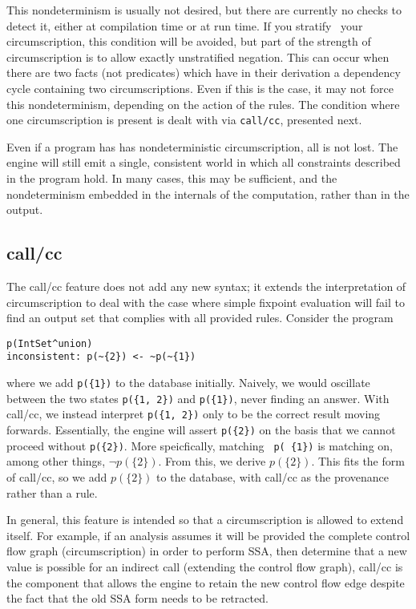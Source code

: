This nondeterminism is usually not desired, but there are currently no checks to detect it, either at compilation time or at run time.
If you stratify~\cite{prologbook} your circumscription, this condition will be avoided, but part of the strength of circumscription is to allow exactly unstratified negation.
This can occur when there are two facts (not predicates) which have in their derivation a dependency cycle containing two circumscriptions.
Even if this is the case, it may not force this nondeterminism, depending on the action of the rules.
The condition where one circumscription is present is dealt with via \texttt{call/cc}, presented next.

Even if a program has has nondeterministic circumscription, all is not lost.
The engine will still emit a single, consistent world in which all constraints described in the program hold.
In many cases, this may be sufficient, and the nondeterminism embedded in the internals of the computation, rather than in the output.

\subsection{call/cc}
\label{holmes:sec:callcc}
The call/cc feature does not add any new syntax; it extends the interpretation of circumscription to deal with the case where simple fixpoint evaluation will fail to find an output set that complies with all provided rules.
Consider the program
\begin{verbatim}
p(IntSet^union)
inconsistent: p(~{2}) <- ~p(~{1})
\end{verbatim}
where we add \texttt{p(\{1\})} to the database initially.
Naively, we would oscillate between the two states \texttt{p(\{1, 2\})} and \texttt{p(\{1\})}, never finding an answer.
With call/cc, we instead interpret \texttt{p(\{1, 2\})} only to be the correct result moving forwards.
Essentially, the engine will assert \texttt{p(\{2\})} on the basis that we cannot proceed without \texttt{p(\{2\})}.
More speicfically, matching \texttt{~p(~\{1\})} is matching on, among other things, $\neg p(\{2\})$.
From this, we derive $p(\{2\})$.
This fits the form of call/cc, so we add $p(\{2\})$ to the database, with call/cc as the provenance rather than a rule.

In general, this feature is intended so that a circumscription is allowed to extend itself.
For example, if an analysis assumes it will be provided the complete control flow graph (circumscription) in order to perform SSA, then determine that a new value is possible for an indirect call (extending the control flow graph), call/cc is the component that allows the engine to retain the new control flow edge despite the fact that the old SSA form needs to be retracted.
